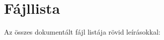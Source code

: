 \section{Fájllista}
Az összes dokumentált fájl listája rövid leírásokkal\-:\begin{DoxyCompactList}
\item{}
\item{}
\end{DoxyCompactList}
